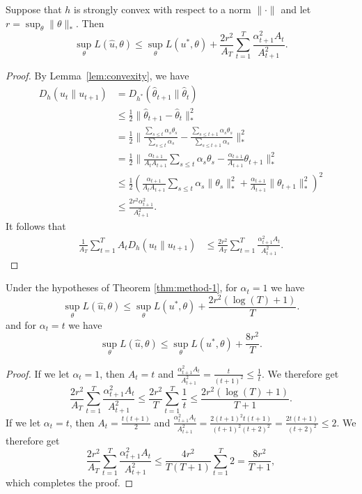 \documentclass{article}
\begin{document}
\begin{theorem}
\label{thm:method-1}
Suppose that $h$ is strongly convex with respect to a norm $\|\cdot\|$ 
and let $r = \sup_{\theta} \|\theta\|_{*}$. Then 
\[ \sup_{\theta} L(\hat{u}, \theta) \leq \sup_{\theta} L(u^*, \theta) + \frac{2r^2}{A_T} \sum_{t=1}^T \frac{\alpha_{t+1}^2A_t}{A_{t+1}^2}. \]
\end{theorem}
\begin{proof}
By Lemma~\ref{lem:convexity}, we have 
\begin{align*}
D_h(u_t \| u_{t+1}) &= D_{h^*}(\hat{\theta}_{t+1} \| \hat{\theta}_{t}) \\
 &\leq \frac{1}{2}\|\hat\theta_{t+1}-\hat\theta_{t}\|_{*}^2 \\
 &= \frac{1}{2}\|\frac{\sum_{s \leq t}\alpha_s\theta_s}{\sum_{s \leq t} \alpha_s} - \frac{\sum_{s \leq t+1}\alpha_s\theta_s}{\sum_{s \leq t+1} \alpha_s}\|_{*}^2 \\
 &= \frac{1}{2}\|\frac{\alpha_{t+1}}{A_tA_{t+1}} \sum_{s \leq t} \alpha_s\theta_s - \frac{\alpha_{t+1}}{A_{t+1}} \theta_{t+1}\|_{*}^2 \\
 &\leq \frac{1}{2} \left(\frac{\alpha_{t+1}}{A_tA_{t+1}} \sum_{s \leq t} \alpha_s\|\theta_s\|_{*}^2 + \frac{\alpha_{t+1}}{A_{t+1}} \|\theta_{t+1}\|_{*}^2\right)^2 \\
 &\leq \frac{2r^2\alpha_{t+1}^2}{A_{t+1}^2}.
\end{align*}
It follows that 
\begin{align*}
\frac{1}{A_T} \sum_{t=1}^T A_tD_h(u_t \| u_{t+1}) &\leq \frac{2r^2}{A_T} \sum_{t=1}^T \frac{\alpha_{t+1}^2A_t}{A_{t+1}^2}.
\end{align*}
\end{proof}

\begin{corollary} 
\label{cor:method-1}
Under the hypotheses of Theorem \ref{thm:method-1}, for $\alpha_{t} = 1$ we have
\[ \sup_{\theta} L(\hat{u}, \theta) \leq \sup_{\theta} L(u^*, \theta) + \frac{2r^2 (\log (T) + 1)}{T}. \]
and for $\alpha_t = t$ we have
\[ \sup_{\theta} L(\hat{u}, \theta) \leq \sup_{\theta} L(u^*, \theta) + \frac{8r^2}{T}. \]
\end{corollary}
\begin{proof}
If we let $\alpha_t = 1$, then $A_t = t$ and $\frac{\alpha_{t+1}^2A_t}{A_{t+1}^2} = \frac{t}{(t+1)^{2}} \le \frac{1}{t}$.
We therefore get
\begin{equation}
\frac{2r^2}{A_T} \sum_{t=1}^T \frac{\alpha_{t+1}^2A_t}{A_{t+1}^2} \leq \frac{2r^2}{T} \sum_{t=1}^{T}\frac{1}{t} \leq \frac{2r^2(\log (T) + 1)}{T+1}.
\end{equation}
If we let $\alpha_t = t$, then $A_t = \frac{t(t+1)}{2}$ and 
$\frac{\alpha_{t+1}^2A_t}{A_{t+1}^2} = \frac{2(t+1)^2t(t+1)}{(t+1)^2(t+2)^2} = \frac{2t(t+1)}{(t+2)^2} \leq 2$.
We therefore get
\begin{equation}
\frac{2r^2}{A_T} \sum_{t=1}^T \frac{\alpha_{t+1}^2A_t}{A_{t+1}^2} \leq \frac{4r^2}{T(T+1)} \sum_{t=1}^{T}2 = \frac{8r^2}{T+1},
\end{equation}
which completes the proof.
\end{proof}
\end{document}
